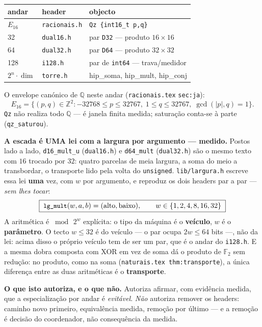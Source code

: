 \documentclass[11pt,a4paper]{article}
\newcommand{\code}[1]{\texttt{\small #1}}
\newcommand{\Z}{\ensuremath{\mathbb{Z}}}
\newcommand{\Q}{\ensuremath{\mathbb{Q}}}
\begin{document}
\begin{center}\small
\begin{tabular}{@{}lll@{}}
\toprule
andar & header & objecto \\
\midrule
$E_{16}$ & \code{racionais.h} & \code{Qz \{int16\_t p,q\}} \\
32 & \code{dual16.h} & par \code{D32} --- produto $16\times16$ \\
64 & \code{dual32.h} & par \code{D64} --- produto $32\times32$ \\
128 & \code{i128.h} & par de \code{int64} --- trava/medidor \\
$2^n\!\cdot\!\dim$ & \code{torre.h} & hip\_soma, hip\_mult, hip\_conj \\
\bottomrule
\end{tabular}
\end{center}

\medskip\noindent O envelope canónico de $\Q$ neste andar (\code{racionais.tex}
\code{sec:ja}):
\[
E_{16}=\bigl\{(p,q)\in\Z^{2}:
-32768\le p\le 32767,\;1\le q\le 32767,\;\gcd(|p|,q)=1\bigr\}.
\]
\code{Qz} não realiza todo $\Q$ --- é janela finita medida; saturação conta-se
à parte (\code{qz\_saturou}).

\medskip\noindent\textbf{A escada é UMA lei com a largura por argumento --- medido.}
Postos lado a lado, \code{d16\_mult\_u} (\code{dual16.h}) e \code{d64\_mult}
(\code{dual32.h}) são o mesmo texto com $16$ trocado por $32$: quatro parcelas de
meia largura, a soma do meio a transbordar, o transporte lido pela volta do
\code{unsigned}. \code{lib/largura.h} escreve essa lei \textbf{uma} vez, com $w$
por argumento, e reproduz os dois headers par a par --- \emph{sem lhes tocar}:
\[
\boxed{\;\code{lg\_mult}(w,a,b)=(\text{alto},\text{baixo}),
\qquad w\in\{1,2,4,8,16,32\}\;}
\]
A aritmética é $\bmod\,2^{w}$ explícita: o tipo da máquina é o \textbf{veículo},
$w$ é o \textbf{parâmetro}. O tecto $w\le32$ é do veículo --- o par ocupa
$2w\le64$ bits ---, não da lei: acima disso o próprio veículo tem de ser um par,
que é o andar do \code{i128.h}. E a mesma dobra composta com XOR em vez de soma
dá o produto de $\mathbb{F}_2$ sem redução: no produto, como na soma
(\code{naturais.tex thm:transporte}), a única diferença entre as duas aritméticas
é o \textbf{transporte}.

\medskip\noindent\textbf{O que isto autoriza, e o que não.} Autoriza afirmar,
com evidência medida, que a especialização por andar é \emph{evitável}. \emph{Não}
autoriza remover os headers: caminho novo primeiro, equivalência medida, remoção
por último --- e a remoção é decisão do coordenador, não consequência da medida.
\end{document}
